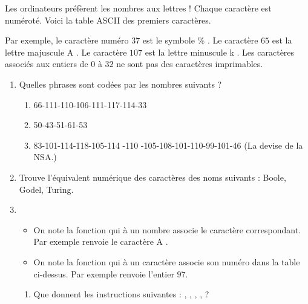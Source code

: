\documentclass[class=report,crop=false, 12pt]{standalone}
\begin{document}
\begin{activite}

Les ordinateurs préfèrent les nombres aux lettres ! Chaque caractère est numéroté.
Voici la table ASCII des premiers caractères.


Par exemple, le caractère numéro $37$ est le symbole \og \% \fg{}.
Le caractère $65$ est la lettre majuscule \og A \fg{}. Le caractère $107$ est la lettre minuscule \og k \fg{}. Les caractères associés aux entiers de $0$ à $32$ ne sont pas des caractères imprimables.

\begin{enumerate}
  \item Quelles phrases sont codées par les nombres suivants ?
  \begin{enumerate}
    \item 66-111-110-106-111-117-114-33
   

    \item 50-43-51-61-53 
    
    
    \item 83-101-114-118-105-114 -110  -105-108-101-110-99-101-46 (La devise de la NSA.)
   
  \end{enumerate}

  \item Trouve l'équivalent numérique des caractères des noms suivants :
  Boole, Godel, Turing.
  
  \item 
  \begin{itemize}
    \item On note  la fonction qui à un nombre associe le caractère correspondant.
  Par exemple  renvoie le caractère \og A \fg{}.
    \item On note  la fonction qui à un caractère associe son numéro dans la table ci-dessus. Par exemple  renvoie l'entier $97$.
  \end{itemize}
  \begin{enumerate}
    \item Que donnent les instructions suivantes :
    , , , 
     ,  ?
     

\end{enumerate}
\end{enumerate}
\end{activite}
\end{document}
